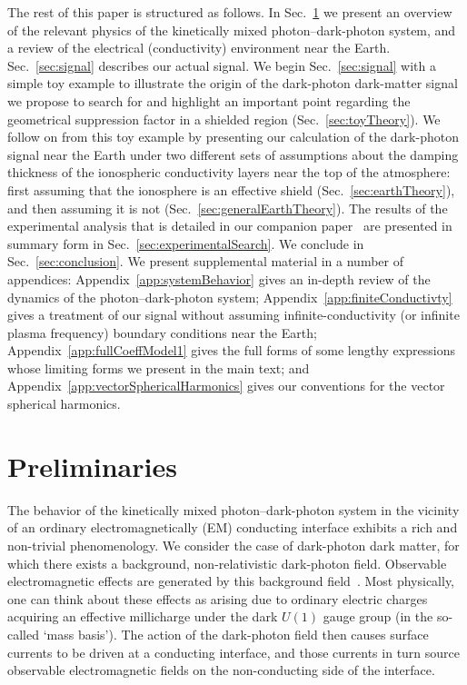 \documentclass[amsmath,amssymb,aps,10pt,prd,letterpaper,nofootinbib,balancelastpage,notitlepage,superscriptaddress,twocolumn,floatfix]{revtex4-2}
\newcommand{\secref}[2][]{Sec{#1}.~\ref{#2}}		%
\newcommand{\appref}[2][x]{Appendi{#1}~\ref{#2}}	%
\begin{document}
The rest of this paper is structured as follows.
In \secref{sec:problemStatement} we present an overview of the relevant physics of the kinetically mixed photon--dark-photon system, and a review of the electrical (conductivity) environment near the Earth.
\secref{sec:signal} describes our actual signal.
We begin \secref{sec:signal} with a simple toy example to illustrate the origin of the dark-photon dark-matter signal we propose to search for and highlight an important point regarding the geometrical suppression factor in a shielded region (\secref{sec:toyTheory}).
We follow on from this toy example by presenting our calculation of the dark-photon signal near the Earth under two different sets of assumptions about the damping thickness of the ionospheric conductivity layers near the top of the atmosphere: first assuming that the ionosphere is an effective shield (\secref{sec:earthTheory}), and then assuming it is not (\secref{sec:generalEarthTheory}).
The results of the experimental analysis that is detailed in our companion paper~\cite{Fedderke:2021qva} are presented in summary form in \secref{sec:experimentalSearch}.
We conclude in \secref{sec:conclusion}.
We present supplemental material in a number of appendices: \appref{app:systemBehavior} gives an in-depth review of the dynamics of the photon--dark-photon system; 
\appref{app:finiteConductivty} gives a treatment of our signal without assuming infinite-conductivity (or infinite plasma frequency) boundary conditions near the Earth;
\appref{app:fullCoeffModel1} gives the full forms of some lengthy expressions whose limiting forms we present in the main text;
and \appref{app:vectorSphericalHarmonics} gives our conventions for the vector spherical harmonics.


\section{Preliminaries}
\label{sec:problemStatement}

The behavior of the kinetically mixed photon--dark-photon system in the vicinity of an ordinary electromagnetically (EM) conducting interface exhibits a rich and non-trivial phenomenology.
We consider the case of dark-photon dark matter, for which there exists a background, non-relativistic dark-photon field. 
Observable electromagnetic effects are generated by this background field~\cite{Graham:2014sha,Chaudhuri:2014dla}.
Most physically, one can think about these effects as arising due to ordinary electric charges acquiring an effective millicharge under the dark $U(1)$ gauge group (in the so-called `mass basis').
The action of the dark-photon field then causes surface currents to be driven at a conducting interface, and those currents in turn source observable electromagnetic fields on the non-conducting side of the interface.
\end{document}
